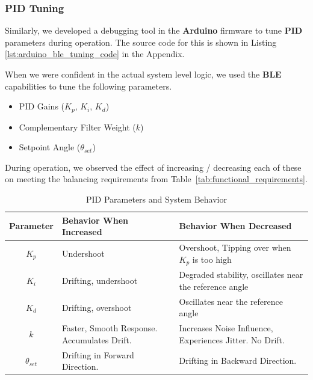 \documentclass{article}
\begin{document}
\subsubsection{PID Tuning}

\begin{minipage}{\linewidth}
    Similarly, we developed a debugging tool in the \textbf{Arduino} firmware to tune \textbf{PID} parameters during operation.
    The source code for this is shown in Listing \ref{lst:arduino_ble_tuning_code} in the Appendix. \\
\end{minipage}

\begin{minipage}{\linewidth}
    When we were confident in the actual system level logic, we used the \textbf{BLE} capabilities to tune the following parameters. \\
\end{minipage}

\begin{itemize}
    \item PID Gains ($K_p$, $K_i$, $K_d$)
    \item Complementary Filter Weight ($k$)
    \item Setpoint Angle ($\theta_{set}$)
\end{itemize}

\begin{minipage}{\linewidth}
    During operation, we observed the effect of increasing / decreasing each of these on meeting the balancing requirements from
    Table~\ref{tab:functional_requirements}. \\
\end{minipage}

\begin{table}[H]
    \centering
    \renewcommand{\arraystretch}{1.3}
    \begin{tabularx}{\textwidth}{|c|X|X|}
        \hline
        \textbf{Parameter} & \textbf{Behavior When Increased} & \textbf{Behavior When Decreased} \\
        \hline
        $K_p$ & Undershoot & Overshoot, Tipping over when $K_p$ is too high \\
        \hline
        $K_i$ & Drifting, undershoot & Degraded stability, oscillates near the reference angle \\
        \hline
        $K_d$ & Drifting, overshoot & Oscillates near the reference angle \\
        \hline
        $k$ & Faster, Smooth Response. Accumulates Drift. & Increases Noise Influence, Experiences Jitter. No Drift. \\
        \hline
        $\theta_{set}$ & Drifting in Forward Direction. & Drifting in Backward Direction. \\
        \hline
    \end{tabularx}
    \caption{PID Parameters and System Behavior}
    \label{tab:parameter_behavior}
\end{table}
\end{document}
